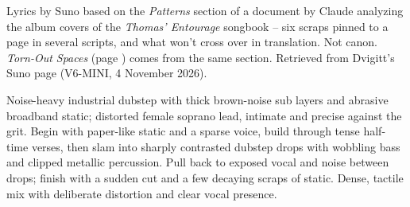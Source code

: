 
\label{sec:blank-scraps}
\begin{notes}
Lyrics by Suno based on the \emph{Patterns} section of a document by Claude analyzing the album covers of the \emph{Thomas' Entourage} songbook -- six scraps pinned to a page in several scripts, and what won't cross over in translation. Not canon. \emph{Torn-Out Spaces} (page \pageref{sec:torn-out-spaces}) comes from the same section. Retrieved from Dvigitt's Suno page (V6-MINI, 4 November 2026).
\end{notes}
\begin{style}
Noise-heavy industrial dubstep with thick brown-noise sub layers and abrasive broadband static; distorted female soprano lead, intimate and precise against the grit. Begin with paper-like static and a sparse voice, build through tense half-time verses, then slam into sharply contrasted dubstep drops with wobbling bass and clipped metallic percussion. Pull back to exposed vocal and noise between drops; finish with a sudden cut and a few decaying scraps of static. Dense, tactile mix with deliberate distortion and clear vocal presence.
\end{style}
